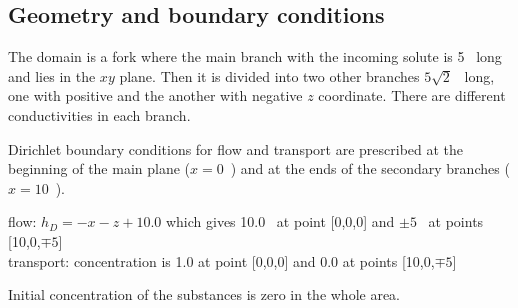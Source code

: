 \subsection*{Geometry and boundary conditions}
The domain is a fork where the main branch with the incoming solute is 5~ long and lies in 
the $xy$ plane. Then it is divided into two other branches $5\sqrt{2}$~ long, one with 
positive and the another with negative $z$ coordinate. There are different conductivities in each branch.

Dirichlet boundary conditions for flow and transport are prescribed at the beginning of the main 
plane ($x=0$~) and at the ends of the secondary branches ($x=10$~).

flow: $h_D=-x-z+10.0$ which gives 10.0~ at point [0,0,0] and $\pm5$~ at points [10,0,$\mp5$]\\
transport: concentration is 1.0 at point [0,0,0] and 0.0 at points [10,0,$\mp5$]

Initial concentration of the substances is zero in the whole area. 
%

